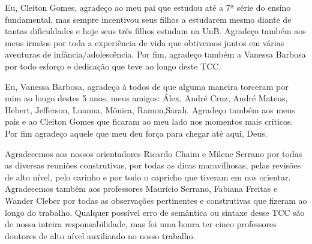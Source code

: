 \begin{agradecimentos}
Eu, Cleiton Gomes, agradeço ao meu pai que estudou até a 7ª série do ensino fundamental, mas sempre incentivou seus filhos a estudarem mesmo diante de tantas dificuldades e hoje seus três filhos estudam na UnB. Agradeço também aos meus irmãos por toda a experiência de vida que obtivemos juntos em várias aventuras de infância/adolescência. Por fim, agradeço também a Vanessa Barbosa por todo esforço e dedicação que teve ao longo deste TCC.

Eu, Vanessa Barbosa, agradeço à todos de que alguma maneira torceram por mim ao longo destes 5 anos, meus amigos: Álex, André Cruz, André Mateus, Hebert, Jefferson, Luanna, Mônica, Ramon,Sarah. Agradeço também aos meus pais e ao Cleiton Gomes que ficaram ao meu lado nos momentos mais críticos. Por fim agradeço aquele que meu deu força para chegar até aqui, Deus.

Agradecemos aos nossos orientadores Ricardo Chaim e Milene Serrano por todas as diversas reuniões construtivas, por todas as dicas maravilhosas, pelas revisões de alto nível, pelo carinho e por todo o capricho que tiveram em nos orientar. Agradecemos também aos professores Maurício Serrano, Fabiana Freitas e Wander Cleber por todas as observações pertinentes e construtivas que fizeram ao longo do trabalho. Qualquer possível erro de semântica ou sintaxe desse TCC são de nossa inteira responsabilidade, mas foi uma honra ter cinco professores doutores de alto nível auxiliando no nosso trabalho.

\end{agradecimentos}
